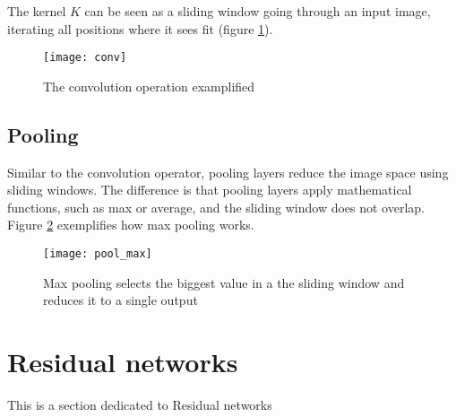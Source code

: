 The kernel $K$ can be seen as a sliding window going through an input image, iterating all positions where it sees fit (figure \ref{fig:conv}).

\begin{figure}[b!]
\centering
\texttt{[image: conv]}
\caption{The convolution operation examplified}
\label{fig:conv}
\end{figure}


\subsection{Pooling}
\label{subsec:obj_cnn_pooling}

Similar to the convolution operator, pooling layers reduce the image space using sliding windows. The difference is that pooling layers apply mathematical functions, such as max or average, and the sliding window does not overlap. Figure \ref{fig:pool_max} exemplifies how max pooling works.

\begin{figure}[b!]
\centering
\texttt{[image: pool\_max]}
\caption{Max pooling selects the biggest value in a the sliding window and reduces it to a single output}
\label{fig:pool_max}
\end{figure}

\section{Residual networks}
\label{sec:obj_resnet}

This is a section dedicated to Residual networks \cite{resnet}